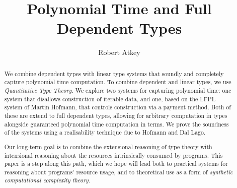 \documentclass[acmsmall,review,screen,anonymous]{acmart}
\begin{document}
\title{Polynomial Time and Full Dependent Types}

\author{Robert Atkey}



\begin{abstract}
  We combine dependent types with linear type systems that soundly and
  completely capture polynomial time computation. To combine dependent
  and linear types, we use \emph{Quantitative Type Theory}. We explore
  two systems for capturing polynomial time: one system that disallows
  construction of iterable data, and one, based on the LFPL system of
  Martin Hofmann, that controls construction via a payment
  method. Both of these are extend to full dependent types, allowing
  for arbitrary computation in types alongside guaranteed polynomial
  time computation in terms. We prove the soundness of the systems
  using a realisability technique due to Hofmann and Dal Lago.

  Our long-term goal is to combine the extensional reasoning of type
  theory with intensional reasoning about the resources intrinsically
  consumed by programs. This paper is a step along this path, which we
  hope will lead both to practical systems for reasoning about
  programs' resource usage, and to theoretical use as a form of
  \emph{synthetic computational complexity theory}.
\end{abstract}
\end{document}
